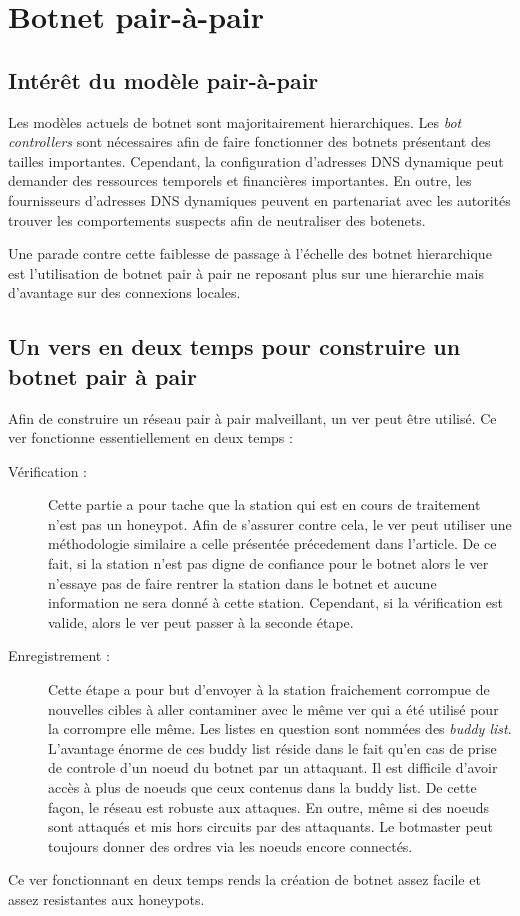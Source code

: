 \section{Botnet pair-à-pair}

\subsection{Intérêt du modèle pair-à-pair}

Les modèles actuels de botnet sont majoritairement hierarchiques. Les \textit{bot
controllers} sont nécessaires afin de faire fonctionner des botnets présentant des
tailles importantes. Cependant, la configuration d'adresses DNS dynamique peut demander
des ressources temporels et financières importantes. En outre, les fournisseurs d'adresses
DNS dynamiques peuvent en partenariat avec les autorités trouver les comportements suspects
afin de neutraliser des botenets.

Une parade contre cette faiblesse de passage à l'échelle des botnet hierarchique est l'utilisation de botnet pair à pair
ne reposant plus sur une hierarchie mais d'avantage sur des connexions locales.


\subsection{Un vers en deux temps pour construire un botnet pair à pair}

Afin de construire un réseau pair à pair malveillant, un ver peut être utilisé.
Ce ver fonctionne essentiellement en deux temps :

\begin{description}

\item[Vérification :] Cette partie a pour tache que la station qui est en cours de traitement
n'est pas un honeypot. Afin de s'assurer contre cela, le ver peut utiliser une méthodologie similaire
a celle présentée précedement dans l'article. De ce fait, si la station n'est pas digne de confiance
pour le botnet alors le ver n'essaye pas de faire rentrer la station dans le botnet et aucune information
ne sera donné à cette station. Cependant, si la vérification est valide, alors le ver peut passer à la seconde
étape.

\item[Enregistrement :] Cette étape a pour but d'envoyer à la station fraichement corrompue de nouvelles cibles
à aller contaminer avec le même ver qui a été utilisé pour la corrompre elle même. Les listes
en question sont nommées des \textit{buddy list}. L'avantage énorme de ces buddy list réside dans le fait qu'en
cas de prise de controle d'un noeud du botnet par un attaquant. Il est difficile d'avoir accès à plus de noeuds
que ceux contenus dans la buddy list. De cette façon, le réseau est robuste aux attaques. En outre, même si des
noeuds sont attaqués et mis hors circuits par des attaquants. Le botmaster peut toujours donner des ordres via
les noeuds encore connectés.

\end{description}

Ce ver fonctionnant en deux temps rends la création de botnet assez facile et assez resistantes aux honeypots.
